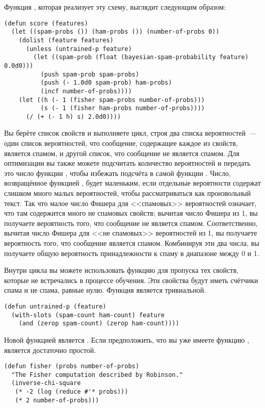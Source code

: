 Функция , которая реализует эту схему, выглядит следующим образом:

\begin{lstlisting}
(defun score (features)
  (let ((spam-probs ()) (ham-probs ()) (number-of-probs 0))
    (dolist (feature features)
      (unless (untrained-p feature)
        (let ((spam-prob (float (bayesian-spam-probability feature) 0.0d0)))
          (push spam-prob spam-probs)
          (push (- 1.0d0 spam-prob) ham-probs)
          (incf number-of-probs))))
    (let ((h (- 1 (fisher spam-probs number-of-probs)))
          (s (- 1 (fisher ham-probs number-of-probs))))
      (/ (+ (- 1 h) s) 2.0d0))))
\end{lstlisting}

Вы берёте список свойств и выполняете цикл, строя два списка вероятностей~--- один список
вероятностей, что сообщение, содержащее каждое из свойств, является спамом, и другой
список, что сообщение не является спамом.  Для оптимизации вы также можете подсчитать
количество вероятностей и передать это число функции , чтобы избежать
подсчёта в самой функции .  Число, возвращённое функцией , будет
маленьким, если отдельные вероятности содержат слишком много малых вероятностей, чтобы
рассматриваться как произвольный текст.  Так что малое число Фишера для <<спамовых>>
вероятностей означает, что там содержится много не спамовых свойств; вычитая число Фишера
из 1, вы получаете вероятность того, что сообщение не является спамом.  Соответственно,
вычитая число Фишера для <<не спамовых>> вероятностей из 1, вы получаете вероятность того, что
сообщение является спамом.  Комбинируя эти два числа, вы получаете общую вероятность
принадлежности к спаму в диапазоне между 0 и 1.

Внутри цикла вы можете использовать функцию  для пропуска тех свойств,
которые не встречались в процессе обучения.  Эти свойства будут иметь счётчики спама и не
спама, равные нулю.  Функция  является тривиальной.

\begin{lstlisting}
(defun untrained-p (feature)
  (with-slots (spam-count ham-count) feature
    (and (zerop spam-count) (zerop ham-count))))
\end{lstlisting}

Новой функцией является .  Если предположить, что вы уже имеете функцию
,  является достаточно простой.

\begin{lstlisting}
(defun fisher (probs number-of-probs)
  "The Fisher computation described by Robinson."
  (inverse-chi-square 
   (* -2 (log (reduce #'* probs)))
   (* 2 number-of-probs)))
\end{lstlisting}

